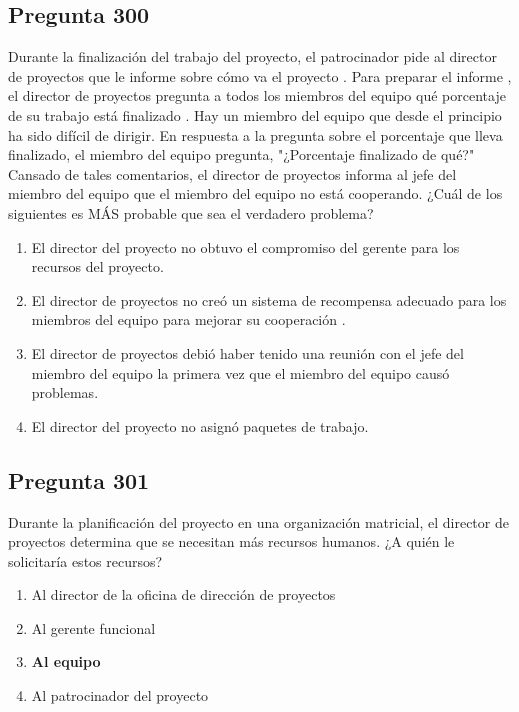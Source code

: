 \documentclass[11pt,a4paper]{article}
\begin{document}
\subsection*{Pregunta 300}
Durante la finalización del trabajo del proyecto, el patrocinador pide al director de proyectos que le informe sobre cómo va el proyecto . Para preparar el informe , el director de proyectos pregunta a todos los miembros del equipo qué porcentaje de su trabajo está finalizado . Hay un miembro del equipo que desde el principio ha sido difícil de dirigir. En respuesta a la pregunta sobre el porcentaje que lleva finalizado, el miembro del equipo pregunta, "¿Porcentaje finalizado de qué?" Cansado de tales comentarios, el director de proyectos informa al jefe del miembro del equipo que el miembro del equipo no está cooperando. ¿Cuál de los siguientes es MÁS probable que sea el verdadero problema?

\begin{enumerate}[label=\alph*)]
  \item El director del proyecto no obtuvo el compromiso del gerente para los recursos del proyecto.
  \item El director de proyectos no creó un sistema de recompensa adecuado para los miembros del equipo para mejorar su cooperación .
  \item El director de proyectos debió haber tenido una reunión con el jefe del miembro del equipo la primera vez que el miembro del equipo causó problemas.
  \item El director del proyecto no asignó paquetes de trabajo.
\end{enumerate}

\subsection*{Pregunta 301}
Durante la planificación del proyecto en una organización matricial, el director de proyectos determina que se necesitan más recursos humanos. ¿A quién le solicitaría estos recursos?

\begin{enumerate}[label=\alph*)]
  \item Al director de la oficina de dirección de proyectos
  \item Al gerente funcional
  \item \textbf{Al equipo}
  \item Al patrocinador del proyecto
\end{enumerate}
\end{document}
